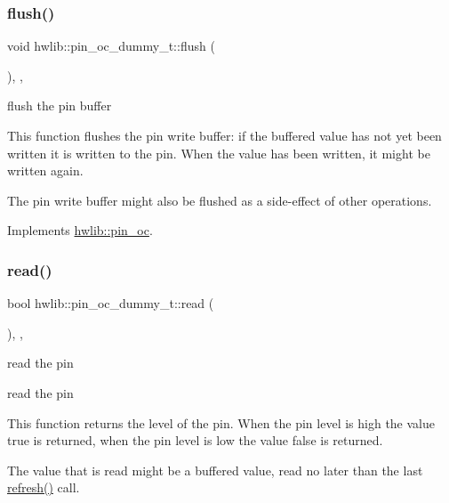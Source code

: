 \subsubsection{\texorpdfstring{flush()}{flush()}}
{\footnotesize\ttfamily void hwlib\+::pin\+\_\+oc\+\_\+dummy\+\_\+t\+::flush (\begin{DoxyParamCaption}{ }\end{DoxyParamCaption})\hspace{0.3cm}{\ttfamily [inline]}, {\ttfamily [override]}, {\ttfamily [virtual]}}





flush the pin buffer

This function flushes the pin write buffer\+: if the buffered value has not yet been written it is written to the pin. When the value has been written, it might be written again.

The pin write buffer might also be flushed as a side-\/effect of other operations. 

Implements \hyperlink{classhwlib_1_1pin__oc_a021036a4566c712e43250ddd28a85e54}{hwlib\+::pin\+\_\+oc}.

\mbox{\label{classhwlib_1_1pin__oc__dummy__t_a53c06f28f7885d1bed4d29cb15aa4b33}} 
\subsubsection{\texorpdfstring{read()}{read()}}
{\footnotesize\ttfamily bool hwlib\+::pin\+\_\+oc\+\_\+dummy\+\_\+t\+::read (\begin{DoxyParamCaption}{ }\end{DoxyParamCaption})\hspace{0.3cm}{\ttfamily [inline]}, {\ttfamily [override]}, {\ttfamily [virtual]}}





read the pin

read the pin

This function returns the level of the pin. When the pin level is high the value true is returned, when the pin level is low the value false is returned.

The value that is read might be a buffered value, read no later than the last \hyperlink{classhwlib_1_1pin__oc__dummy__t_a3609bb12b15736b0ad6d734c1d45ae49}{refresh()} call.

